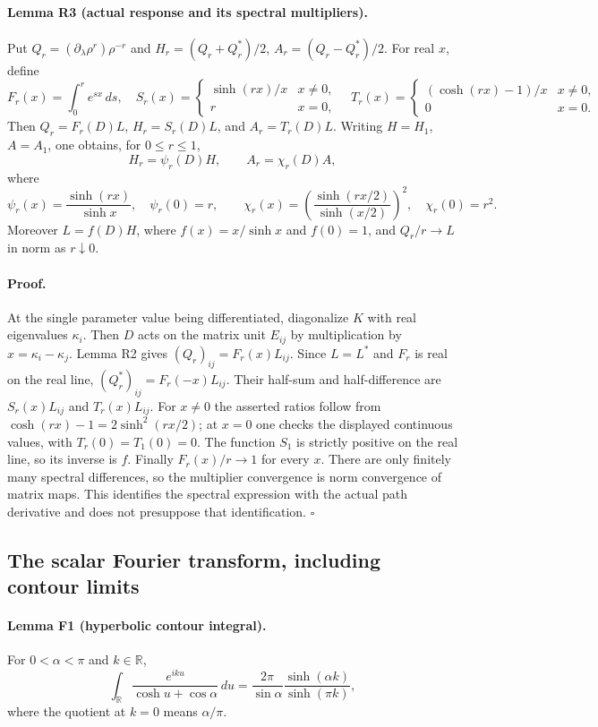 \paragraph{Lemma R3 (actual response and its spectral multipliers).}
Put $Q_r=(\partial_\lambda\rho^r)\rho^{-r}$ and
$H_r=(Q_r+Q_r^*)/2$, $A_r=(Q_r-Q_r^*)/2$. For real $x$, define
\[
 F_r(x)=\int_0^r e^{sx}\,ds,
 \quad S_r(x)=\begin{cases}\sinh(rx)/x&x\ne0,\\r&x=0,\end{cases}
 \quad T_r(x)=\begin{cases}(\cosh(rx)-1)/x&x\ne0,\\0&x=0.\end{cases}
\]
Then $Q_r=F_r(D)L$, $H_r=S_r(D)L$, and $A_r=T_r(D)L$.
Writing $H=H_1$, $A=A_1$, one obtains, for $0\leq r\leq1$,
\[
 H_r=\psi_r(D)H,\qquad
 A_r=\chi_r(D)A,
\]
where
\[
 \psi_r(x)=\frac{\sinh(rx)}{\sinh x},\quad\psi_r(0)=r,
 \qquad
 \chi_r(x)=\left(\frac{\sinh(rx/2)}{\sinh(x/2)}\right)^2,
 \quad\chi_r(0)=r^2.
\]
Moreover $L=f(D)H$, where $f(x)=x/\sinh x$ and $f(0)=1$, and
$Q_r/r\to L$ in norm as $r\downarrow0$.

\paragraph{Proof.}
At the single parameter value being differentiated, diagonalize $K$ with
real eigenvalues $\kappa_i$. Then $D$ acts on the matrix unit $E_{ij}$
by multiplication by $x=\kappa_i-\kappa_j$. Lemma R2 gives
$(Q_r)_{ij}=F_r(x)L_{ij}$. Since $L=L^*$ and $F_r$ is real on the
real line, $(Q_r^*)_{ij}=F_r(-x)L_{ij}$. Their half-sum and
half-difference are $S_r(x)L_{ij}$ and $T_r(x)L_{ij}$.
For $x\ne0$ the asserted ratios follow from
$\cosh(rx)-1=2\sinh^2(rx/2)$; at $x=0$ one checks the displayed
continuous values, with $T_r(0)=T_1(0)=0$.
The function $S_1$ is strictly positive on the real line, so its inverse
is $f$. Finally $F_r(x)/r\to1$ for every $x$. There are only finitely
many spectral differences, so the multiplier convergence is norm
convergence of matrix maps. This identifies the spectral expression with
the actual path derivative and does not presuppose that identification.
\hfill$\square$

\subsection{The scalar Fourier transform, including contour limits}

\paragraph{Lemma F1 (hyperbolic contour integral).}
For $0<\alpha<\pi$ and $k\in\mathbb R$,
\begin{equation}
 \int_{\mathbb R}\frac{e^{iku}}{\cosh u+\cos\alpha}\,du
 =\frac{2\pi}{\sin\alpha}\frac{\sinh(\alpha k)}{\sinh(\pi k)},
 \label{urgent:contour}
\end{equation}
where the quotient at $k=0$ means $\alpha/\pi$.

